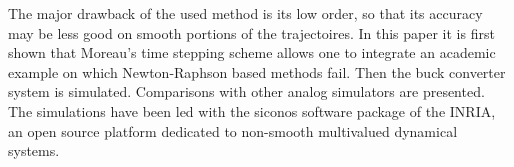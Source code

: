\documentclass{article}
\begin{document}
The major drawback of the used method is its low order, so that its accuracy may be less good on smooth portions of the trajectoires. In this paper it is first shown that Moreau's time stepping scheme allows one to integrate an academic example on which Newton-Raphson based methods fail. Then the buck converter system is simulated. Comparisons with other analog simulators are presented. The simulations have been led with the {\sc siconos} software package of the INRIA, an open source platform dedicated to non-smooth multivalued dynamical systems. 




\end{document}
